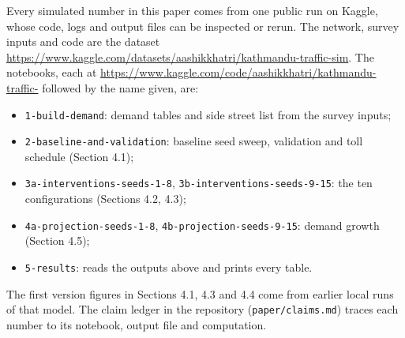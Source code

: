 Every simulated number in this paper comes from one public run on Kaggle, whose code, logs and
output files can be inspected or rerun. The network, survey inputs and code are the dataset
\url{https://www.kaggle.com/datasets/aashikkhatri/kathmandu-traffic-sim}. The notebooks, each at
\url{https://www.kaggle.com/code/aashikkhatri/kathmandu-traffic-} followed by the name given, are:
\begin{itemize}
\item \texttt{1-build-demand}: demand tables and side street list from the survey inputs;
\item \texttt{2-baseline-and-validation}: baseline seed sweep, validation and toll schedule (Section 4.1);
\item \texttt{3a-interventions-seeds-1-8}, \texttt{3b-interventions-seeds-9-15}: the ten configurations (Sections 4.2, 4.3);
\item \texttt{4a-projection-seeds-1-8}, \texttt{4b-projection-seeds-9-15}: demand growth (Section 4.5);
\item \texttt{5-results}: reads the outputs above and prints every table.
\end{itemize}
The first version figures in Sections 4.1, 4.3 and 4.4 come from earlier local runs of that model.
The claim ledger in the repository (\texttt{paper/claims.md}) traces each number to its notebook,
output file and computation.
